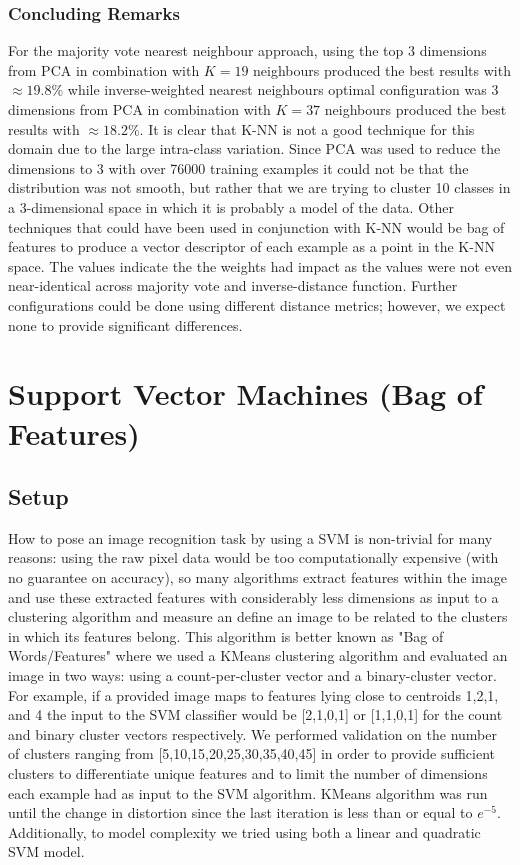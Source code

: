 \documentclass{article} %
\begin{document}
\subsubsection{Concluding Remarks}
For the majority vote nearest neighbour approach, using the top 3 dimensions from PCA in combination with $K=19$ neighbours produced the best results with $\approx 19.8\%$ while inverse-weighted nearest neighbours optimal configuration was 3 dimensions from PCA in combination with $K=37$ neighbours produced the best results with $\approx 18.2\%$. It is clear that K-NN is not a good technique for this domain due to the large intra-class variation. Since PCA was used to reduce the dimensions to 3 with over 76000 training examples it could not be that the distribution was not smooth, but rather that we are trying to cluster 10 classes in a 3-dimensional space in which it is probably a model of the data.  Other techniques that could have been used in conjunction with K-NN would be bag of features to produce a vector descriptor of each example as a point in the K-NN space. The values indicate the the weights had impact as the values were not even near-identical across majority vote and inverse-distance function. Further configurations could be done using different distance metrics; however, we expect none to provide significant differences.

\section{Support Vector Machines (Bag of Features)}

\subsection{Setup}
How to pose an image recognition task by using a SVM is non-trivial for many reasons: using the raw pixel data would be too computationally expensive (with no guarantee on accuracy), so many algorithms extract features within the image and use these extracted features with considerably less dimensions as input to a clustering algorithm and measure an define an image to be related to the clusters in which its features belong.  This algorithm is better known as "Bag of Words/Features" where we used a KMeans clustering algorithm and evaluated an image in two ways: using a count-per-cluster vector and a binary-cluster vector.  For example, if a provided image maps to features lying close to centroids 1,2,1, and 4 the input to the SVM classifier would be [2,1,0,1] or [1,1,0,1] for the count and binary cluster vectors respectively.  We performed validation on the number of clusters ranging from [5,10,15,20,25,30,35,40,45] in order to provide sufficient clusters to differentiate unique features and to limit the number of dimensions each example had as input to the SVM algorithm. KMeans algorithm was run until the change in distortion since the last iteration is less than or equal to $e^{-5}$. Additionally, to model complexity we tried using both a linear and quadratic SVM model.
\end{document}
